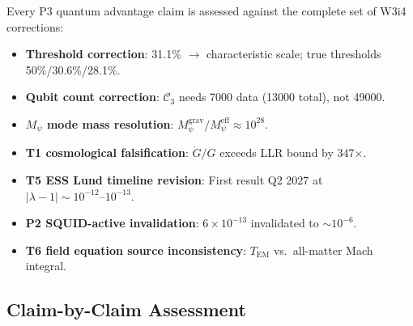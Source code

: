 \documentclass[11pt]{article}
\theoremstyle{definition}
\theoremstyle{remark}
\begin{document}
Every P3 quantum advantage claim is assessed against the complete set
of W3i4 corrections:
\begin{itemize}
  \item \textbf{Threshold correction}: 31.1\% $\to$ characteristic scale;
    true thresholds 50\%/30.6\%/28.1\%.
  \item \textbf{Qubit count correction}: $\mathcal{C}_3$ needs 7000 data
    (13000 total), not 49000.
  \item \textbf{$M_\psi$ mode mass resolution}: $M_\psi^{\mathrm{grav}}/
    M_\psi^{\mathrm{eff}} \approx 10^{28}$.
  \item \textbf{T1 cosmological falsification}: $\dot{G}/G$ exceeds LLR
    bound by 347$\times$.
  \item \textbf{T5 ESS Lund timeline revision}: First result Q2 2027 at
    $|\lambda-1| \sim 10^{-12}\text{--}10^{-13}$.
  \item \textbf{P2 SQUID-active invalidation}: $6\times10^{-13}$ invalidated
    to $\sim10^{-6}$.
  \item \textbf{T6 field equation source inconsistency}: $T_{\mathrm{EM}}$
    vs.\ all-matter Mach integral.
\end{itemize}

\subsection{Claim-by-Claim Assessment}
\label{sec:claim-assessment}
\end{document}

